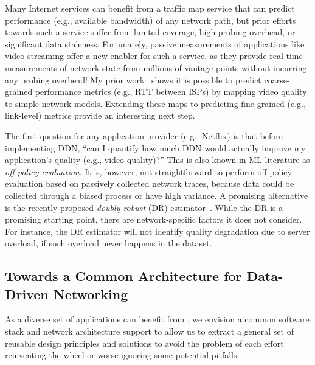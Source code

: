 Many Internet services can benefit from a traffic map service that can predict performance (e.g., available bandwidth) of any network path, but prior efforts towards such a service suffer from limited coverage, high probing overhead, or significant data staleness. 
Fortunately, passive measurements of applications like video streaming offer a new enabler for such a service, as they provide real-time measurements of network state from millions of vantage points without incurring any probing overhead!
My prior work~\cite{via,sun2014using} shows it is possible to predict coarse-grained performance metrics (e.g., RTT between ISPs) by mapping video quality to simple network models.
Extending these maps to predicting fine-grained (e.g., link-level) metrics provide an interesting next step.

The first question for any application provider (e.g., Netflix) is
that before implementing DDN, ``can I quantify how much DDN would actually improve
my application's quality (e.g., video quality)?''
This is also known in ML literature as {\em off-policy evaluation}.
It is, however, not straightforward to perform off-policy evaluation
based on passively collected network traces, because data could be collected
through a biased process or have high variance.
A promising alternative is the recently proposed
{\em doubly robust} (DR) estimator~\cite{doublerobust}.
While the DR is a promising starting point,
there are network-specific factors it does not consider. For instance, the DR
estimator will not identify quality degradation due to server overload, if such overload
never happens in the dataset.

\subsection{Towards a Common Architecture for Data-Driven Networking}

As a diverse set of applications can benefit from \ddn, we envision a common software stack and network architecture support to  allow
us to extract a general set of reusable design principles and 
solutions to avoid the problem of each
effort reinventing the wheel or worse ignoring some potential pitfalls.

